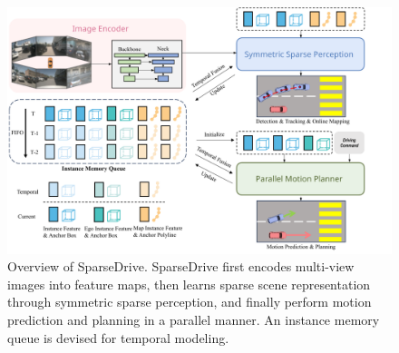 \begin{figure}[htbp]
  \centering
  \includegraphics[width=0.8\linewidth]{Figures/overview_.pdf}
  \caption{Overview of SparseDrive. SparseDrive first encodes multi-view images into feature maps, then learns sparse scene representation through symmetric sparse perception, and finally perform motion prediction and planning in a parallel manner. An instance memory queue is devised for temporal modeling.}
  \label{fig:overview}
\end{figure}
